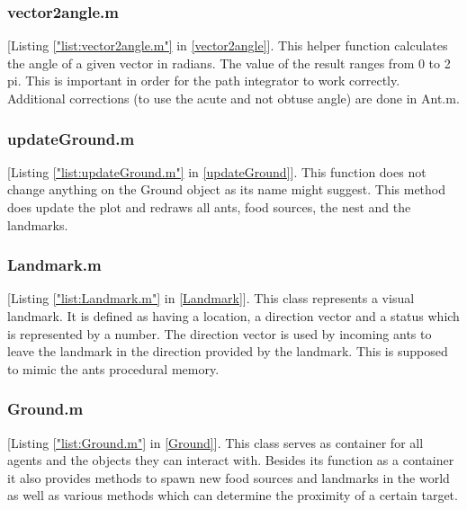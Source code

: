 \documentclass[11pt]{article}
\begin{document}
\subsubsection{vector2angle.m}
[Listing \ref{"list:vector2angle.m"} in \ref{vector2angle}]. This helper function calculates the angle of a given vector in radians. The value of the result ranges from 0 to 2 pi. This is important in order for the path integrator to work correctly. Additional corrections (to use the acute and not obtuse angle) are done in Ant.m. 


\subsubsection{updateGround.m}
[Listing \ref{"list:updateGround.m"} in \ref{updateGround}]. This function does not change anything on the Ground object as its name might suggest. This
method does update the plot and redraws all ants, food sources, the nest and the landmarks.


\subsubsection{Landmark.m}
[Listing \ref{"list:Landmark.m"} in \ref{Landmark}]. This class represents a visual landmark. It is defined as having a location, a direction vector and a
status which is represented by a number. The direction vector is used by incoming ants to leave the
landmark in the direction provided by the landmark. This is supposed to mimic the ants procedural
memory.

\subsubsection{Ground.m}
[Listing \ref{"list:Ground.m"} in \ref{Ground}]. This class serves as container for all agents and the objects they can interact with. Besides its function as a container it also provides methods to spawn new food sources and landmarks in the world as well as various methods which can determine the proximity of a certain target. 
\end{document}
